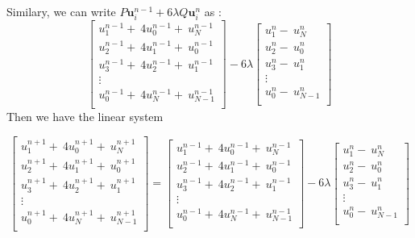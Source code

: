 \documentclass{report}
\begin{document}
Similary, we can write $P\textbf{u}^{n-1}_{i}+  6\lambda Q\textbf{u}^{n}_{i}$ as :
 \begin{displaymath}
\left[
\begin{matrix}
u^{n-1}_{1} + \ 4u^{n-1}_{0}+ \ u^{n-1}_{N}\\
u^{n-1}_{2} + \ 4u^{n-1}_{1}+ \ u^{n-1}_{0}\\
u^{n-1}_{3} + \ 4u^{n-1}_{2}+ \ u^{n-1}_{1}\\
\vdots\\
u^{n-1}_{0}+ \ 4u^{n-1}_{N}+ \ u^{n-1}_{N-1}\\
\end{matrix}
\right]
-6\lambda
\left[
\begin{matrix}
u^{n}_{1} - \ u^{n}_{N}\\
u^{n}_{2} - \ u^{n}_{0}\\
u^{n}_{3} - \ u^{n}_{1}\\
\vdots\\
u^{n}_{0} - \ u^{n}_{N-1}\\
\end{matrix}
\right]
\end{displaymath}
Then we have the linear system

\begin{displaymath}
\left[
\begin{matrix}
u^{n+1}_{1} + \ 4u^{n+1}_{0}+ \ u^{n+1}_{N}\\
u^{n+1}_{2} + \ 4u^{n+1}_{1}+ \ u^{n+1}_{0}\\
u^{n+1}_{3} + \ 4u^{n+1}_{2}+ \ u^{n+1}_{1}\\
\vdots\\
u^{n+1}_{0}+ \ 4u^{n+1}_{N}+ \ u^{n+1}_{N-1}\\
\end{matrix}
\right]
=
\left[
\begin{matrix}
u^{n-1}_{1} + \ 4u^{n-1}_{0}+ \ u^{n-1}_{N}\\
u^{n-1}_{2} + \ 4u^{n-1}_{1}+ \ u^{n-1}_{0}\\
u^{n-1}_{3} + \ 4u^{n-1}_{2}+ \ u^{n-1}_{1}\\
\vdots\\
u^{n-1}_{0}+ \ 4u^{n-1}_{N}+ \ u^{n-1}_{N-1}\\
\end{matrix}
\right]
-6\lambda
\left[
\begin{matrix}
u^{n}_{1} - \ u^{n}_{N}\\
u^{n}_{2} - \ u^{n}_{0}\\
u^{n}_{3} - \ u^{n}_{1}\\
\vdots\\
u^{n}_{0} - \ u^{n}_{N-1}\\
\end{matrix}
\right]
\end{displaymath}
\end{document}
